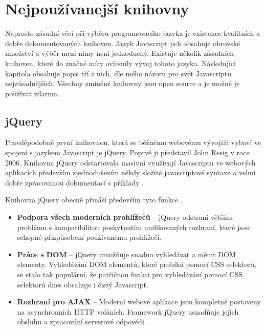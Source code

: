 \section{Nejpoužívanejší knihovny}
Naprosto zásadní věcí při výběru programovacího jazyka je existence kvalitních a dobře dokumentovaných knihoven. Jazyk Javascript jich obsahuje obrovské množství a výběr mezi nimy není jednoduchý. Existuje několik zásadních knihoven, které do značné míry ovlivnily vývoj tohoto jazyka. Následující kapitola obsahuje popis tří z nich, dle mého názoru pro svět Javascriptu nejzásadnějších. Všechny zmíněné knihovny jsou open source a je možné je používat zdarma.

\subsection{jQuery}
Pravděpodobně první knihovnou, která se běžnému webovému vývojáři vybaví ve spojení s jazykem Javascript je jQuery. Poprvé ji představil John Resig v roce 2006. Knihovna jQuery odstartovala masivní využívají Javascriptu ve webových aplikacích především zjednodušením někdy složité javascriptové syntaxe a velmi dobře zpracovanou dokumentací s příklady \cite{jquery} \cite{jquery_book}. 

\vspace{3mm}
\noindent Knihovna jQuery obecně přináší především tyto funkce \cite{jquery}.
\begin{itemize}
\item \textbf{Podpora všech moderních prohlížečů} – jQuery odstraní většinu problému s kompatibilitou poskytnutím unifikovaných rozhraní, které jsou schopné přizpůsobení používanému prohlížeči.
\item \textbf{Práce s DOM} – jQuery umožňuje snadno vyhledávat a měnit DOM elementy. Vyhledávání DOM elementů, které probíhá pomocí CSS selektorů, se stalo tak populární, že patřičnou funkci pro vyhledávání pomocí CSS selektorů dnes obsahuje i čistý Javascript.
\item \textbf{Rozhraní pro AJAX} – Moderní webové aplikace jsou kompletně postaveny na asynchronních HTTP voláních. Framework jQuery usnadňuje jejich obsluhu a zpracování serverové odpovědi.
\end{itemize}

